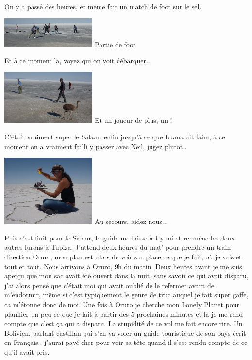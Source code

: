 \begin{multicols}{2}
On y a passé des heures, et meme fait un match de foot sur le sel.

\hspace*{-0.65cm}
\includegraphics[width=4.8cm]{articles/La-paz-humahuaca-et-salaar/12573870691BvG.jpg}
Partie de foot

Et à ce moment la, voyez qui on voit débarquer...

\hspace*{-0.65cm}
\includegraphics[width=4.8cm]{articles/La-paz-humahuaca-et-salaar/1257387056akBO.jpg}
Et un joueur de plus, un !

C'était vraiment super le Salaar, enfin jusqu'à ce que Luana ait faim, à ce moment on a vraiment failli y passer avec Neil, jugez plutot..

\hspace*{-0.65cm}
\includegraphics[width=4.8cm]{articles/La-paz-humahuaca-et-salaar/12572036252qaK.jpg}
Au secours, aidez nous...

Puis c'est finit pour le Salaar, le guide me laisse à Uyuni et renmène les deux autres lurons à Tupiza. J'attend deux heures du mat' pour prendre un train direction Oruro, mon plan est alors de voir sur place ce que je fait, où je vais et tout et tout. Nous arrivons à Oruro, 9h du matin. Deux heures avant je me suis aperçu que mon sac avait été ouvert dans la nuit, sans savoir ce qui avait disparu, j'ai alors pensé que c'était moi qui avait oublié de le refermer avant de m'endormir, même si c'est typiquement le genre de truc auquel je fait super gaffe, ca m'étonne donc de moi. Une fois à Oruro je cherche mon Lonely Planet pour planifier un peu ce que je fait à partir des 5 prochaines minutes et là je me rend compte que c'est ça qui a disparu. La stupidité de ce vol me fait encore rire. Un Bolivien, parlant castillan qui s'en va voler un guide touristique de son pays écrit en Français.. j'aurai payé cher pour voir sa tête quand il s'est rendu compte de ce qu'il avait pris..


\end{multicols}
